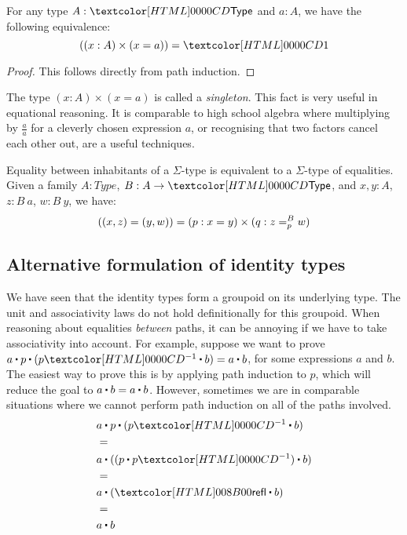 \begin{proposition}
  For any type $A : \Type$ and $a : A$, we have the following
  equivalence:
  $$
  ((x : A) \times (x = a)) = \unitty
  $$
\end{proposition}

\begin{proof}
  This follows directly from path induction.
\end{proof}

The type $(x : A) \times (x = a)$ is called a \emph{singleton}. This
fact is very useful in equational reasoning. It is comparable to high
school algebra where multiplying by $\frac{a}{a}$ for a cleverly
chosen expression $a$, or recognising that two factors cancel
each other out, are a useful techniques.

\begin{proposition}
  Equality between inhabitants of a $\Sigma$-type is equivalent to a
  $\Sigma$-type of equalities. Given a family $A : Type$,
  $B : A \to \Type$, and $x , y : A$, $z : B\ a$, $w : B\ y$, we have:
  $$
  ((x , z) = (y , w)) = (p : x = y) \times (q : \pathover{B}{p}{z}{w})
  $$
\end{proposition}

\subsection{Alternative formulation of identity types}
\label{alt-identity-type}
We have seen that the identity types form a groupoid on its underlying
type. The unit and associativity laws do not hold definitionally for
this groupoid. When reasoning about equalities \emph{between} paths,
it can be annoying if we have to take associativity into account. For
example, suppose we want to prove
$a \ct p \ct (\sym{p} \ct b) = a \ct b$, for some expressions $a$ and
$b$. The easiest way to prove this is by applying path induction to
$p$, which will reduce the goal to $a \ct b = a \ct b$. However,
sometimes we are in comparable situations where we cannot perform path
induction on all of the paths involved.
\begin{align*}
  &a \ct p \ct (\sym{p} \ct b) \\
  &= \\
  &a \ct ((p \ct \sym{p}) \ct b) \\
  &= \\
  &a \ct (\refl \ct b) \\
  &= \\
  &a \ct b
\end{align*}


